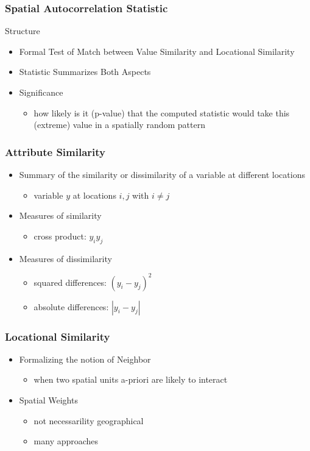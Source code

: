 \documentclass[nototal]{beamer}
\begin{document}
\begin{frame}
  \frametitle{Spatial Autocorrelation Statistic}
  \begin{block}{Structure}
    \begin{itemize}
      \item Formal Test of Match between Value Similarity and Locational
	Similarity
      \item Statistic Summarizes Both Aspects
      \item Significance
	\begin{itemize}
	  \item how likely is it (p-value) that the computed statistic would
	    take this (extreme) value in a spatially random pattern
	\end{itemize}
    \end{itemize}
   \end{block}
 \end{frame}

\begin{frame}
  \frametitle{Attribute Similarity}
    \begin{itemize}
      \item Summary of the similarity or dissimilarity of a variable at
	different locations
	\begin{itemize}
	  \item variable $y$ at locations $i,j$ with $i\ne j$
	\end{itemize}
      \item Measures of similarity
	\begin{itemize}
	  \item cross product: $y_i y_j$
	\end{itemize}
      \item Measures of dissimilarity
	\begin{itemize}
	  \item squared differences: $(y_i - y_j)^2$
	  \item absolute differences: $|y_i - y_j|$
	\end{itemize}
    \end{itemize}
 \end{frame}

\begin{frame}
  \frametitle{Locational Similarity}
    \begin{itemize}
      \item Formalizing the notion of Neighbor
	\begin{itemize}
	  \item when two spatial units a-priori are likely to interact
	\end{itemize}
      \item Spatial Weights
	\begin{itemize}
	  \item not necessarility geographical
	  \item many approaches
	\end{itemize}
    \end{itemize}
 \end{frame}
\end{document}
